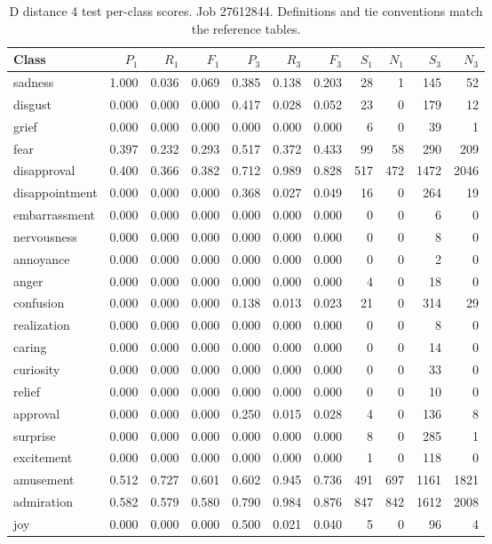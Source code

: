 \begin{table}[!htbp]
\centering
\scriptsize
\setlength{\tabcolsep}{5pt}
\begin{tabular}{lrrrrrrrrrr}
\toprule
Class & $P_1$ & $R_1$ & $F_1$ & $P_3$ & $R_3$ & $F_3$ & $S_1$ & $N_1$ & $S_3$ & $N_3$ \\
\midrule
sadness & 1.000 & 0.036 & 0.069 & 0.385 & 0.138 & 0.203 & 28 & 1 & 145 & 52 \\
disgust & 0.000 & 0.000 & 0.000 & 0.417 & 0.028 & 0.052 & 23 & 0 & 179 & 12 \\
grief & 0.000 & 0.000 & 0.000 & 0.000 & 0.000 & 0.000 & 6 & 0 & 39 & 1 \\
fear & 0.397 & 0.232 & 0.293 & 0.517 & 0.372 & 0.433 & 99 & 58 & 290 & 209 \\
disapproval & 0.400 & 0.366 & 0.382 & 0.712 & 0.989 & 0.828 & 517 & 472 & 1472 & 2046 \\
disappointment & 0.000 & 0.000 & 0.000 & 0.368 & 0.027 & 0.049 & 16 & 0 & 264 & 19 \\
embarrassment & 0.000 & 0.000 & 0.000 & 0.000 & 0.000 & 0.000 & 0 & 0 & 6 & 0 \\
nervousness & 0.000 & 0.000 & 0.000 & 0.000 & 0.000 & 0.000 & 0 & 0 & 8 & 0 \\
annoyance & 0.000 & 0.000 & 0.000 & 0.000 & 0.000 & 0.000 & 0 & 0 & 2 & 0 \\
anger & 0.000 & 0.000 & 0.000 & 0.000 & 0.000 & 0.000 & 4 & 0 & 18 & 0 \\
confusion & 0.000 & 0.000 & 0.000 & 0.138 & 0.013 & 0.023 & 21 & 0 & 314 & 29 \\
realization & 0.000 & 0.000 & 0.000 & 0.000 & 0.000 & 0.000 & 0 & 0 & 8 & 0 \\
caring & 0.000 & 0.000 & 0.000 & 0.000 & 0.000 & 0.000 & 0 & 0 & 14 & 0 \\
curiosity & 0.000 & 0.000 & 0.000 & 0.000 & 0.000 & 0.000 & 0 & 0 & 33 & 0 \\
relief & 0.000 & 0.000 & 0.000 & 0.000 & 0.000 & 0.000 & 0 & 0 & 10 & 0 \\
approval & 0.000 & 0.000 & 0.000 & 0.250 & 0.015 & 0.028 & 4 & 0 & 136 & 8 \\
surprise & 0.000 & 0.000 & 0.000 & 0.000 & 0.000 & 0.000 & 8 & 0 & 285 & 1 \\
excitement & 0.000 & 0.000 & 0.000 & 0.000 & 0.000 & 0.000 & 1 & 0 & 118 & 0 \\
amusement & 0.512 & 0.727 & 0.601 & 0.602 & 0.945 & 0.736 & 491 & 697 & 1161 & 1821 \\
admiration & 0.582 & 0.579 & 0.580 & 0.790 & 0.984 & 0.876 & 847 & 842 & 1612 & 2008 \\
joy & 0.000 & 0.000 & 0.000 & 0.500 & 0.021 & 0.040 & 5 & 0 & 96 & 4 \\
\bottomrule
\end{tabular}
\caption{D distance 4 test per-class scores. Job 27612844. Definitions and tie conventions match the reference tables.}
\label{tab:classes-d_distance_k4}
\end{table}
